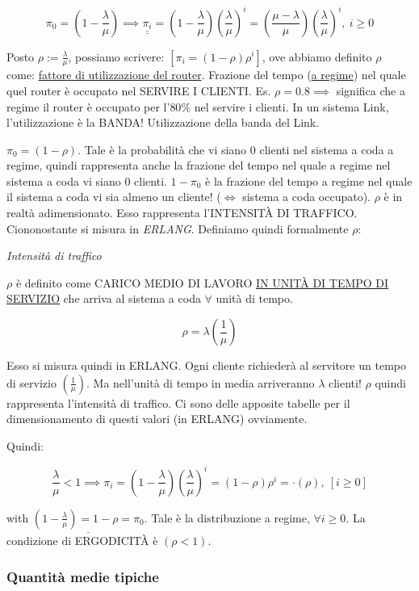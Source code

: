 \[
	\pi_0 = (1-\frac{\lambda}{\mu}) \implies \underline{\underline{\pi_i}} = (1-\frac{\lambda}{\mu})(\frac{\lambda}{\mu})^i = (\frac{\mu-\lambda}{\mu})(\frac{\lambda}{\mu})^i,\ i\geq 0
\]

Posto $\rho := \frac{\lambda}{\mu}$, possiamo scrivere: $[\pi_i = (1-\rho)\rho^i]$, ove abbiamo definito $\rho$ come: \newline
\underline{fattore di utilizzazione del router}. Frazione del tempo (\underline{a regime}) nel quale quel router è occupato nel SERVIRE I CLIENTI.  Es. $\rho=0.8 \implies$ significa che a regime il router è occupato per l'$80\%$ nel servire i clienti. In un sistema Link, l'utilizzazione è la BANDA! Utilizzazione della banda del Link.

$\pi_0 = (1-\rho)$. Tale è la probabilità che vi siano 0 clienti nel sistema a coda a regime, quindi rappresenta anche la frazione del tempo nel quale a regime nel sistema a coda vi siano 0 clienti. $1-\pi_0$ è la frazione del tempo a regime nel quale il sistema a coda vi sia almeno un cliente! ($\iff$ sistema a coda occupato). $\rho$ è in realtà adimensionato. Esso rappresenta l'INTENSIT\`A DI TRAFFICO. Ciononostante si misura in \textit{ERLANG}. Definiamo quindi formalmente $\rho$:

\begin{defn}{\textit{Intensità di traffico}}

$\rho$ è definito come CARICO MEDIO DI LAVORO \underline{IN UNIT\`A DI TEMPO DI SERVIZIO} che arriva al sistema a coda $\forall$ unità di tempo.

\[
	\rho = \lambda(\frac{1}{\mu})
\]
\end{defn}

Esso si misura quindi in ERLANG. Ogni cliente richiederà al servitore un tempo di servizio $(\frac{1}{\mu})$. Ma nell'unità di tempo in media arriveranno $\lambda$ clienti! $\rho$ quindi rappresenta l'intensità di traffico. Ci sono delle apposite tabelle per il dimensionamento di questi valori (in ERLANG) ovviamente.

Quindi:

\[
	\frac{\lambda}{\mu} < 1 \implies \pi_i = (1-\frac{\lambda}{\mu})(\frac{\lambda}{\mu})^i = (1-\rho)\rho^i = \mathord{\cdot}(\rho),\ [i\geq 0]
\]

with $\underline{(1-\frac{\lambda}{\mu}) = 1 - \rho = \pi_0}$. Tale è la distribuzione a regime, $\forall i\geq 0$. 
La condizione di ERGODICIT\`A è $(\rho<1)$.

\subsubsection{Quantità medie tipiche}

